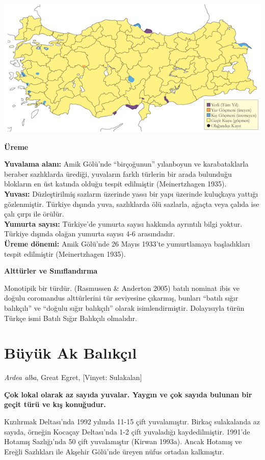 \documentclass[
  letterpaper,
  DIV=11,
  numbers=noendperiod]{scrreprt}
\begin{document}
\includegraphics{images/harita_Page_068.png}

\textbf{Üreme}

\textbf{Yuvalama alanı:} Amik Gölü'nde ``birçoğunun'' yılanboyun ve
karabataklarla beraber sazlıklarda ürediği, yuvaların farklı türlerin
bir arada bulunduğu blokların en üst katında olduğu tespit edilmiştir
(Meinertzhagen 1935).\\
\textbf{Yuvası:} Düzleştirilmiş sazların üzerinde yassı bir yapı
üzerinde kuluçkaya yattığı gözlenmiştir. Türkiye dışında yuva,
sazlıklarda ölü sazlarla, ağaçta veya çalıda ise çalı çırpı ile
örülür.\\
\textbf{Yumurta sayısı:} Türkiye'de yumurta sayısı hakkında ayrıntılı
bilgi yoktur. Türkiye dışında olağan yumurta sayısı 4-6 arasındadır.\\
\textbf{Üreme dönemi:} Amik Gölü'nde 26 Mayıs 1933'te yumurtlamaya
başladıkları tespit edilmiştir (Meinertzhagen 1935).

\textbf{Alttürler ve Sınıflandırma}

Monotipik bir türdür. (Rasmussen \& Anderton 2005) batılı nominat ibis
ve doğulu coromandus alttürlerini tür seviyesine çıkarmış, bunları
``batılı sığır balıkçılı'' ve ``doğulu sığır balıkçılı'' olarak
isimlendirmiştir. Dolayısıyla türün Türkçe ismi Batılı Sığır Balıkçılı
olmalıdır.

\section{Büyük Ak Balıkçıl}\label{buxfcyuxfck-ak-balux131kuxe7ux131l}

\emph{Ardea alba}, Great Egret, {[}Vinyet: Sulakalan{]}

\textbf{Çok lokal olarak az sayıda yuvalar. Yaygın ve çok sayıda bulunan
bir geçit türü ve kış konuğudur.}

Kızılırmak Deltası'nda 1992 yılında 11-15 çift yuvalamıştır. Birkaç
sulakalanda az sayıda, örneğin Kocaçay Deltası'nda 1-2 çift yuvaladığı
kaydedilmiştir. 1991'de Hotamış Sazlığı'nda 50 çift yuvalamıştır (Kirwan
1993a). Ancak Hotamış ve Ereğli Sazlıkları ile Akşehir Gölü'nde üreyen
nüfus ortadan kalkmıştır.
\end{document}

